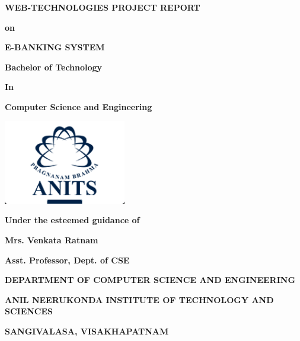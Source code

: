 \begin{titlepage}
  \centering
  {\fontsize{24}{28}\selectfont\bfseries WEB-TECHNOLOGIES PROJECT REPORT\par}
  \vspace{0.3cm}
  {\fontsize{18}{22}\selectfont\bfseries on\par}
  \vspace{0.3cm}
  {\fontsize{24}{28}\selectfont\bfseries E-BANKING SYSTEM\par}
  \vspace{1cm}
  {\fontsize{18}{22}\selectfont\bfseries Bachelor of Technology\par}
  \vspace{0.1cm}
  {\fontsize{18}{22}\selectfont\bfseries In\par}
  \vspace{0.1cm}
  {\fontsize{18}{22}\selectfont\bfseries Computer Science and Engineering\par}
  \includegraphics[width=0.4\textwidth]{anits_logo.png}\par
  \vspace{1cm}
  {\fontsize{18}{22}\selectfont\bfseries Under the esteemed guidance of\par}
  \vspace{0.2cm}
  {\fontsize{18}{22}\selectfont\bfseries Mrs. Venkata Ratnam\par}
  \vspace{0.2cm}
  {\fontsize{18}{22}\selectfont\bfseries Asst. Professor, Dept. of CSE\par}
  \vspace{1cm}
  {\fontsize{18}{22}\selectfont\bfseries DEPARTMENT OF COMPUTER
  SCIENCE AND ENGINEERING\par}
  \vspace{0.3cm}
  {\fontsize{18}{22}\selectfont\bfseries ANIL NEERUKONDA INSTITUTE OF
  TECHNOLOGY AND SCIENCES\par}
  \vspace{0.3cm}
  {\fontsize{18}{22}\selectfont\bfseries SANGIVALASA, VISAKHAPATNAM\par}
\end{titlepage}

